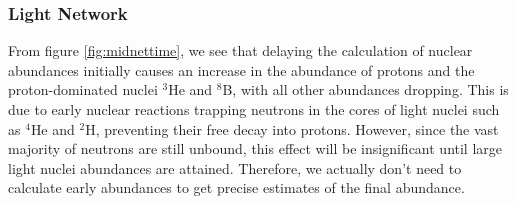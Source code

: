 \subsubsection{Light Network}

From figure \ref{fig:midnettime}, we see that delaying the calculation of nuclear abundances initially causes an increase in the abundance of protons and the proton-dominated nuclei ${}^3$He and ${}^8$B, with all other abundances dropping. This is due to early nuclear reactions trapping neutrons in the cores of light nuclei such as ${}^4$He and ${}^2$H, preventing their free decay into protons. However, since the vast majority of neutrons are still unbound, this effect will be insignificant until large light nuclei abundances are attained. Therefore, we actually don't need to calculate early abundances to get precise estimates of the final abundance. 

